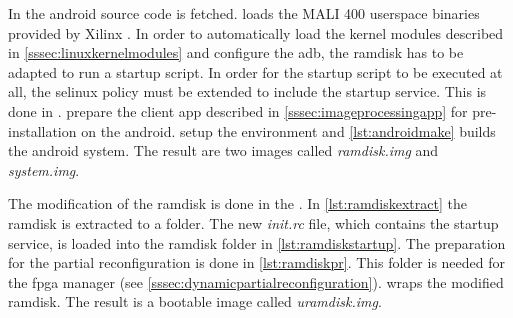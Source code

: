In  the android source code is fetched.
 loads the MALI 400 userspace binaries provided by Xilinx \cite{mali400}. 
In order to automatically load the kernel modules described in \cref{sssec:linuxkernelmodules} and configure the \gls{adb}, the ramdisk has to be adapted to run a startup script. In order for the startup script to be executed at all, the selinux policy must be extended to include the startup service. This is done in .
 prepare the client app described in \cref{sssec:imageprocessingapp} for pre-installation on the android.
 setup the environment and
\cref{lst:androidmake} builds the android system.
The result are two images called \emph{ramdisk.img} and \emph{system.img}.

The modification of the ramdisk is done in the . In \cref{lst:ramdiskextract} the ramdisk is extracted to a folder. The new \emph{init.rc} file, which contains the startup service, is loaded into the ramdisk folder in \cref{lst:ramdiskstartup}. The preparation for the partial reconfiguration is done in \cref{lst:ramdiskpr}. This folder is needed for the \gls{fpga} manager (see \cref{sssec:dynamicpartialreconfiguration}).  wraps the modified ramdisk. The result is a bootable image called \emph{uramdisk.img}.
